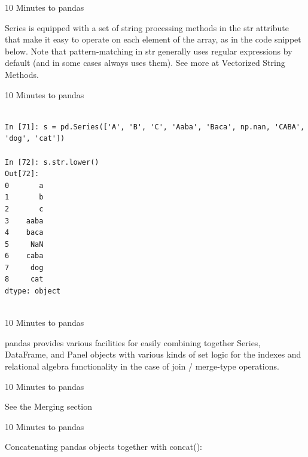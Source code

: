 \documentclass{beamer}
\begin{document}
\begin{frame}[t]{10 Minutes to pandas}

Series is equipped with a set of string processing methods in the str
attribute that make it easy to operate on each element of the array, as in the
code snippet below. Note that pattern-matching in str generally uses regular
expressions by default (and in
some cases always uses them). See more at Vectorized String Methods.

\end{frame}


\begin{frame}[t,fragile]{10 Minutes to pandas}


	\scriptsize
\begin{verbatim}

In [71]: s = pd.Series(['A', 'B', 'C', 'Aaba', 'Baca', np.nan, 'CABA', 'dog', 'cat'])

In [72]: s.str.lower()
Out[72]: 
0       a
1       b
2       c
3    aaba
4    baca
5     NaN
6    caba
7     dog
8     cat
dtype: object


\end{verbatim}


\end{frame}


\begin{frame}[t]{10 Minutes to pandas}

pandas provides various facilities for easily combining together Series,
DataFrame, and Panel objects with various kinds of set logic for the indexes
and relational algebra functionality in the case of join / merge-type
operations.

\end{frame}


\begin{frame}[t]{10 Minutes to pandas}

See the Merging section

\end{frame}


\begin{frame}[t]{10 Minutes to pandas}

Concatenating pandas objects together with concat():

\end{frame}
\end{document}
